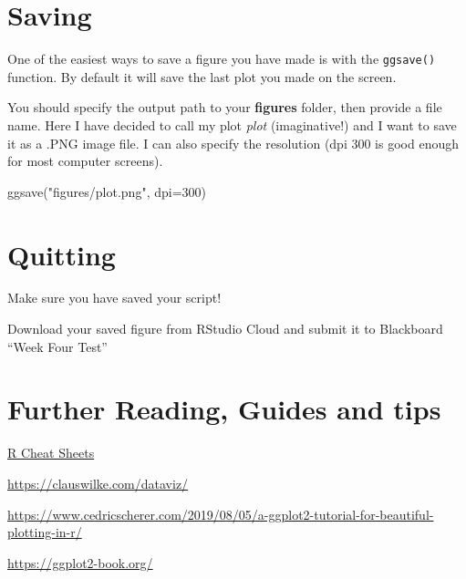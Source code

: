 \documentclass[
]{book}
\makeatletter
\newenvironment{Shaded}{\begin{snugshade}}{\end{snugshade}}
\newcommand{\AttributeTok}[1]{\textcolor[rgb]{0.77,0.63,0.00}{#1}}
\newcommand{\DecValTok}[1]{\textcolor[rgb]{0.00,0.00,0.81}{#1}}
\newcommand{\FunctionTok}[1]{\textcolor[rgb]{0.00,0.00,0.00}{#1}}
\newcommand{\NormalTok}[1]{#1}
\newcommand{\StringTok}[1]{\textcolor[rgb]{0.31,0.60,0.02}{#1}}
\newenvironment{kframe}{%
\medskip{}
\setlength{\fboxsep}{.8em}
 \def\at@end@of@kframe{}%
 \ifinner\ifhmode%
  \def\at@end@of@kframe{\end{minipage}}%
  \begin{minipage}{\columnwidth}%
 \fi\fi%
 \def\FrameCommand##1{\hskip\@totalleftmargin \hskip-\fboxsep
 \colorbox{shadecolor}{##1}\hskip-\fboxsep
     \hskip-\linewidth \hskip-\@totalleftmargin \hskip\columnwidth}%
 \MakeFramed {\advance\hsize-\width
   \@totalleftmargin\z@ \linewidth\hsize
   \@setminipage}}%
 {\par\unskip\endMakeFramed%
 \at@end@of@kframe}
\newenvironment{block}[1]
  {
  \begin{itemize}
  \renewcommand{\labelitemi}{
    \raisebox{-.7\height}[0pt][0pt]{
      {\setkeys{Gin}{width=3em,keepaspectratio}\texttt{[image: images/\#1]}}
    }
  }
  \setlength{\fboxsep}{1em}
  \begin{kframe}
  \item
  }
  {
  \end{kframe}
  \end{itemize}
  }
\newenvironment{rmdquestion}
  {\begin{block}{question}}
  {\end{block}}
\newenvironment{rmdwarning}
  {\begin{block}{warning}}
  {\end{block}}
\makeatother
\begin{document}
\hypertarget{saving}{%
\section{Saving}\label{saving}}

One of the easiest ways to save a figure you have made is with the \texttt{ggsave()} function. By default it will save the last plot you made on the screen.

You should specify the output path to your \textbf{figures} folder, then provide a file name. Here I have decided to call my plot \emph{plot} (imaginative!) and I want to save it as a .PNG image file. I can also specify the resolution (dpi 300 is good enough for most computer screens).

\begin{Shaded}
\begin{Highlighting}[]
\FunctionTok{ggsave}\NormalTok{(}\StringTok{"figures/plot.png"}\NormalTok{, }\AttributeTok{dpi=}\DecValTok{300}\NormalTok{)}
\end{Highlighting}
\end{Shaded}

\hypertarget{quitting-3}{%
\section{Quitting}\label{quitting-3}}

\begin{rmdwarning}
Make sure you have saved your script!
\end{rmdwarning}

\begin{rmdquestion}
Download your saved figure from RStudio Cloud and submit it to
Blackboard ``Week Four Test''
\end{rmdquestion}

\hypertarget{further-reading-guides-and-tips}{%
\section{Further Reading, Guides and tips}\label{further-reading-guides-and-tips}}

\href{https://www.rstudio.com/resources/cheatsheets/}{R Cheat Sheets}

\url{https://clauswilke.com/dataviz/}

\url{https://www.cedricscherer.com/2019/08/05/a-ggplot2-tutorial-for-beautiful-plotting-in-r/}

\url{https://ggplot2-book.org/}
\end{document}
